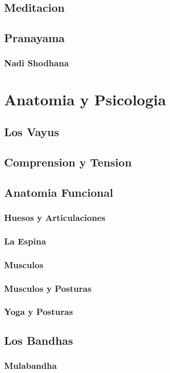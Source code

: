 \documentclass[a4paper]{article}
\begin{document}
\subsection{Meditacion}
\subsection{Pranayama}
\subsubsection{Nadi Shodhana}

\section{Anatomia y Psicologia}
\subsection{Los Vayus}
\subsection{Comprension y Tension}
\subsection{Anatomia Funcional}
\subsubsection{Huesos y Articulaciones}
\subsubsection{La Espina}
\subsubsection{Musculos}
\subsubsection{Musculos y Posturas}
\subsubsection{Yoga y Posturas}
\subsection{Los Bandhas}
\subsubsection{Mulabandha}
\end{document}
